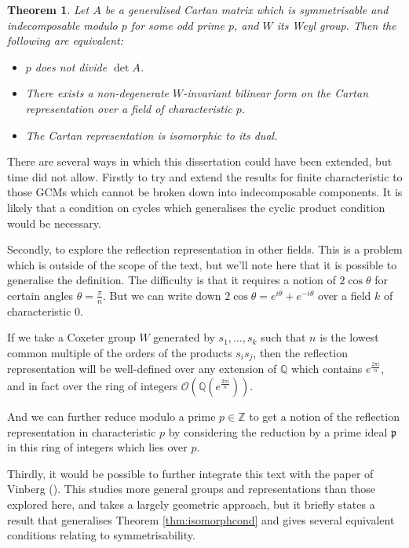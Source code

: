 \documentclass[11pt,a4paper]{report}
\newtheorem{theorem}{Theorem}[chapter]
\theoremstyle{definition}
\begin{document}
\begin{theorem}Let $A$ be a generalised Cartan matrix which is symmetrisable and indecomposable modulo $p$ for some odd prime $p$, and $W$ its Weyl group. Then the following are equivalent: 
\begin{itemize}
    \item $p$ does not divide $\det A$.
    \item There exists a non-degenerate $W$-invariant bilinear form on the Cartan representation over a field of characteristic $p$.
    \item The Cartan representation is isomorphic to its dual.
\end{itemize}
\end{theorem}

There are several ways in which this dissertation could have been extended, but time did not allow. Firstly to try and extend the results for finite characteristic to those GCMs which cannot be broken down into indecomposable components. It is likely that a condition on cycles which generalises the cyclic product condition would be necessary.

Secondly, to explore the reflection representation in other fields. This is a problem which is outside of the scope of the text, but we'll note here that it is possible to generalise the definition. The difficulty is that it requires a notion of $2 \cos \theta$ for certain angles $\theta = \frac{\pi}{n}$. But we can write down $2 \cos \theta = e^{i \theta} + e^{-i \theta}$ over a field $k$ of characteristic $0$.

If we take a Coxeter group $W$ generated by $s_1, \ldots, s_k$ such that $n$ is the lowest common multiple of the orders of the products $s_is_j$, then the reflection representation will be well-defined over any extension of $\mathbb{Q}$ which contains $e^{ \frac{2 \pi i}{n}}$, and in fact over the ring of integers $\mathcal{O}(\mathbb{Q}(e^{\frac{2 \pi i}{n}}))$. 

And we can further reduce modulo a prime $p \in \mathbb{Z}$ to get a notion of the reflection representation in characteristic $p$ by considering the reduction by a prime ideal $\mathfrak{p}$ in this ring of integers which lies over $p$.

Thirdly, it would be possible to further integrate this text with the paper of Vinberg (\cite{Vinberg}). This studies more general groups and representations than those explored here, and takes a largely geometric approach, but it briefly states a result that generalises Theorem \ref{thm:isomorphcond} and gives several equivalent conditions relating to symmetrisability. 











\end{document}
